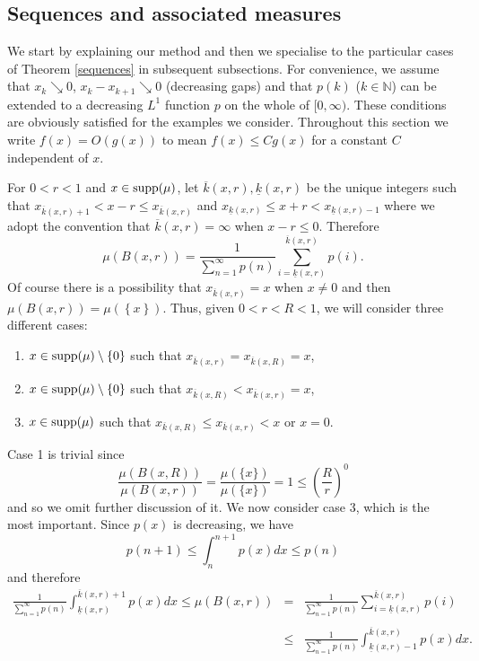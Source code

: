 \documentclass[12pt]{amsart}
\numberwithin{equation}{section}
\renewcommand{\le}{\leqslant}
\renewcommand{\leq}{\leqslant}
\begin{document}
\subsection{Sequences and associated measures}\label{sequenceproof}


We start by explaining our method and then we specialise to the particular cases of  Theorem \ref{sequences} in subsequent subsections.  For convenience, we assume that $x_k \searrow 0$, $x_k-x_{k+1} \searrow 0$ (decreasing gaps) and that $p(k)$ ($k \in \mathbb{N}$) can be extended to a decreasing $L^1$ function $p$ on the whole of $[0,\infty)$.  These conditions are obviously satisfied for the  examples we consider.  Throughout this section we write $f(x)=O(g(x))$ to mean $f(x) \le Cg(x)$ for a constant $C$ independent of $x$.

For  $0<r<1$ and $x\in  \textup{supp}(\mu)$, let $\overline{k}(x,r), \underline{k}(x,r)$   be the unique  integers such that $x_{\overline{k}(x,r)+1}<x-r\le x_{\overline{k}(x,r)}$ and  $x_{\underline{k}(x,r)}\le x+r <x_{\underline{k}(x,r)-1}$ where we adopt the convention that $\overline{k}(x,r) = \infty$ when $x-r \le 0$.    Therefore 
$$
\mu(B(x,r))=\frac{1}{\sum_{n=1}^\infty p(n)} \sum_{i=\underline{k}(x,r)}^{\overline{k}(x,r)} p(i).
$$
Of course there is a possibility that $x_{\overline{k}(x,r)}=x$ when $x\neq 0$ and then $\mu(B(x,r))=\mu(\left\{x\right\})$. Thus, given $0<r<R<1$, we will consider three different cases: 
\begin{enumerate}
\item $x\in \textup{supp}(\mu) \setminus \left\{ 0\right\}$  such that  $x_{\overline{k}(x,r)}=x_{\overline{k}(x,R)}=x$,
\item $x\in \textup{supp}(\mu) \setminus \left\{ 0\right\}$ such that  $x_{\overline{k}(x,R)}<x_{\overline{k}(x,r)}=x$,
\item $x\in \textup{supp}(\mu)$ such that  $x_{\overline{k}(x,R)}\le x_{\overline{k}(x,r)}<x$ or $x=0$.
\end{enumerate}
Case 1 is trivial since
\[
\frac{\mu(B(x,R))}{\mu(B(x,r))}=\frac{\mu(\{x\})}{\mu(\{x\})}=1 \leq \left(\frac{R}{r}\right)^0
\]
and so we omit further discussion of it.   We now consider case 3, which is the most important.  Since $p(x)$ is decreasing, we have
$$p(n+1)\le \int_{n}^{n+1}p(x)dx \le p(n)$$
and therefore
\begin{eqnarray*}
\frac{1}{\sum_{n=1}^\infty p(n)} \int_{\underline{k}(x,r)}^{\overline{k}(x,r)+1} p(x)dx \le  \mu(B(x,r)) &=& \frac{1}{\sum_{n=1}^\infty p(n)}\sum_{i=\underline{k}(x,r)}^{\overline{k}(x,r)} p(i) \\ \\
&\le& \frac{1}{\sum_{n=1}^\infty p(n)} \int_{\underline{k}(x,r)-1}^{\overline{k}(x,r)} p(x)dx .
\end{eqnarray*}
\end{document}
